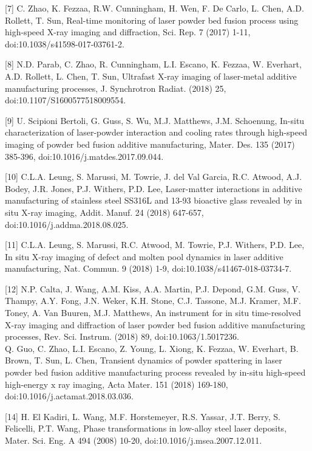 \documentclass[10pt]{article}
\begin{document}
[7] C. Zhao, K. Fezzaa, R.W. Cunningham, H. Wen, F. De Carlo, L. Chen, A.D. Rollett, T. Sun, Real-time monitoring of laser powder bed fusion process using high-speed X-ray imaging and diffraction, Sci. Rep. 7 (2017) 1-11, doi:10.1038/s41598-017-03761-2.

[8] N.D. Parab, C. Zhao, R. Cunningham, L.I. Escano, K. Fezzaa, W. Everhart, A.D. Rollett, L. Chen, T. Sun, Ultrafast X-ray imaging of laser-metal additive manufacturing processes, J. Synchrotron Radiat. (2018) 25, doi:10.1107/S1600577518009554.

[9] U. Scipioni Bertoli, G. Guss, S. Wu, M.J. Matthews, J.M. Schoenung, In-situ characterization of laser-powder interaction and cooling rates through high-speed imaging of powder bed fusion additive manufacturing, Mater. Des. 135 (2017) 385-396, doi:10.1016/j.matdes.2017.09.044.

[10] C.L.A. Leung, S. Marussi, M. Towrie, J. del Val Garcia, R.C. Atwood, A.J. Bodey, J.R. Jones, P.J. Withers, P.D. Lee, Laser-matter interactions in additive manufacturing of stainless steel SS316L and 13-93 bioactive glass revealed by in situ X-ray imaging, Addit. Manuf. 24 (2018) 647-657, doi:10.1016/j.addma.2018.08.025.

[11] C.L.A. Leung, S. Marussi, R.C. Atwood, M. Towrie, P.J. Withers, P.D. Lee, In situ $\mathrm{X}$-ray imaging of defect and molten pool dynamics in laser additive manufacturing, Nat. Commun. 9 (2018) 1-9, doi:10.1038/s41467-018-03734-7.

[12] N.P. Calta, J. Wang, A.M. Kiss, A.A. Martin, P.J. Depond, G.M. Guss, V. Thampy, A.Y. Fong, J.N. Weker, K.H. Stone, C.J. Tassone, M.J. Kramer, M.F. Toney, A. Van Buuren, M.J. Matthews, An instrument for in situ time-resolved X-ray imaging and diffraction of laser powder bed fusion additive manufacturing processes, Rev. Sci. Instrum. (2018) 89, doi:10.1063/1.5017236.\\
[13] Q. Guo, C. Zhao, L.I. Escano, Z. Young, L. Xiong, K. Fezzaa, W. Everhart, B. Brown, T. Sun, L. Chen, Transient dynamics of powder spattering in laser powder bed fusion additive manufacturing process revealed by in-situ high-speed high-energy $\mathrm{x}$ ray imaging, Acta Mater. 151 (2018) 169-180, doi:10.1016/j.actamat.2018.03.036.

[14] H. El Kadiri, L. Wang, M.F. Horstemeyer, R.S. Yassar, J.T. Berry, S. Felicelli, P.T. Wang, Phase transformations in low-alloy steel laser deposits, Mater. Sci. Eng. A 494 (2008) 10-20, doi:10.1016/j.msea.2007.12.011.
\end{document}
